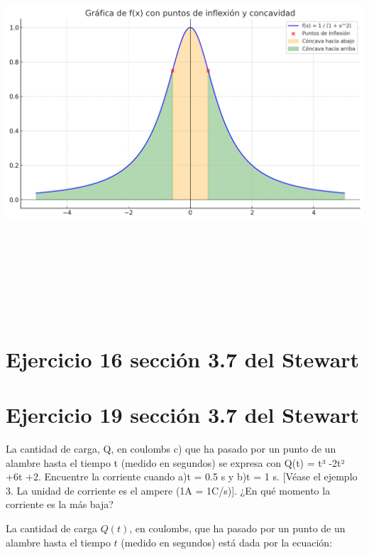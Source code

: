 \documentclass[11pt,letterpaper]{article}
\begin{document}
\begin{center}
    \includegraphics[height=15.0cm]{./imagenes/grafica.png}
\end{center}

\section*{Ejercicio 16 sección 3.7 del Stewart}
\section*{Ejercicio 19 sección 3.7 del Stewart}
La cantidad de carga, Q, en coulombs c) que ha pasado por un punto de un alambre hasta el tiempo t (medido en segundos) se expresa con Q(t) = t³ -2t² +6t +2. Encuentre la corriente cuando a)t = 0.5 s y b)t = 1 s. [Véase el ejemplo 3. La unidad de corriente es el ampere
(1A = 1C/s)]. ¿En qué momento la corriente es la más baja?

La cantidad de carga \( Q(t) \), en coulombs, que ha pasado por un punto de un alambre hasta el tiempo \( t \) (medido en segundos) está dada por la ecuación:
\end{document}
